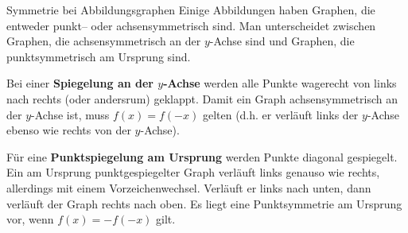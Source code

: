 \documentclass[../../main.tex]{subfiles}
\begin{document}
\begin{nutshell}{Symmetrie bei Abbildungsgraphen}
    Einige Abbildungen haben Graphen, die entweder punkt-- oder achsensymmetrisch sind. Man unterscheidet zwischen Graphen, die achsensymmetrisch an der $y$-Achse sind und Graphen, die punktsymmetrisch am Ursprung sind.
    
    Bei einer \textbf{Spiegelung an der $y$-Achse} werden alle Punkte wagerecht von links nach rechts (oder andersrum) geklappt. Damit ein Graph achsensymmetrisch an der $y$-Achse ist, muss $f(x)=f(-x)$ gelten (d.h. er verläuft links der $y$-Achse ebenso wie rechts von der $y$-Achse).
    
    Für eine \textbf{Punktspiegelung am Ursprung} werden Punkte diagonal gespiegelt. Ein am Ursprung punktgespiegelter Graph verläuft links genauso wie rechts, allerdings mit einem Vorzeichenwechsel. Verläuft er links nach unten, dann verläuft der Graph rechts nach oben. Es liegt eine Punktsymmetrie am Ursprung vor, wenn $f(x)=-f(-x)$ gilt.
\end{nutshell}
\end{document}
